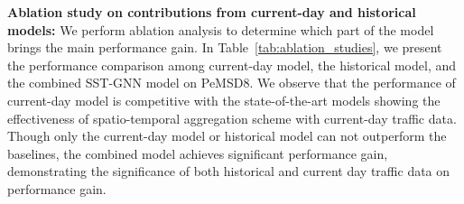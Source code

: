 \documentclass[runningheads]{llncs}
\begin{document}
\begin{table*}[b]
\centering
{}
\caption{SST-GNN's performance on PeMSD8 while trained on PeMSD7}
\label{tab:trained_PeMSD7_on_PeMSD8_vs_LSGCN}
\end{table*}

\noindent
\textbf{Ablation study on contributions  from current-day and historical models:}  We perform ablation analysis to determine which part of the model brings the main performance gain. In Table~\ref{tab:ablation_studies}, we present the performance comparison among current-day model, the historical model, and  the combined SST-GNN model on PeMSD8. We observe that the performance of current-day model is competitive with the state-of-the-art models showing the effectiveness of spatio-temporal aggregation scheme with current-day traffic data. Though only the current-day model or historical model can not outperform the baselines, the combined model achieves significant performance gain,  demonstrating the significance of both historical and current day traffic data on performance gain.
\end{document}
